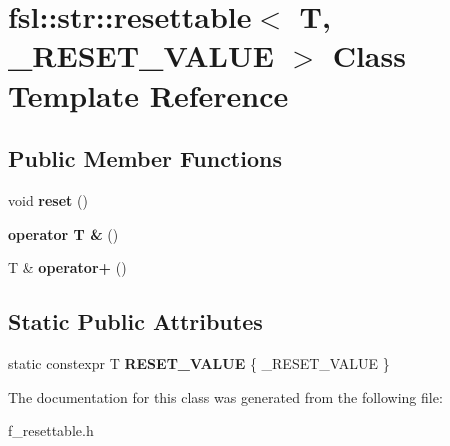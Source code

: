 \hypertarget{classfsl_1_1str_1_1resettable}{}\section{fsl\+::str\+::resettable$<$ T, \+\_\+\+R\+E\+S\+E\+T\+\_\+\+V\+A\+L\+UE $>$ Class Template Reference}
\label{classfsl_1_1str_1_1resettable}
\subsection*{Public Member Functions}
\begin{DoxyCompactItemize}
\item 
\mbox{\label{classfsl_1_1str_1_1resettable_a454894ac4eb98c7edce192fed38f08b0}} 
void {\bfseries reset} ()
\item 
\mbox{\label{classfsl_1_1str_1_1resettable_a952a526a826663cc9aebd3fad900e8d2}} 
{\bfseries operator T \&} ()
\item 
\mbox{\label{classfsl_1_1str_1_1resettable_a0293eaf7c93c48e2aeecdcaf1ea33b80}} 
T \& {\bfseries operator+} ()
\end{DoxyCompactItemize}
\subsection*{Static Public Attributes}
\begin{DoxyCompactItemize}
\item 
\mbox{\label{classfsl_1_1str_1_1resettable_ac8369a279a028cde8d74fa5f812696a7}} 
static constexpr T {\bfseries R\+E\+S\+E\+T\+\_\+\+V\+A\+L\+UE} \{ \+\_\+\+R\+E\+S\+E\+T\+\_\+\+V\+A\+L\+UE \}
\end{DoxyCompactItemize}


The documentation for this class was generated from the following file\+:\begin{DoxyCompactItemize}
\item 
f\+\_\+resettable.\+h\end{DoxyCompactItemize}
